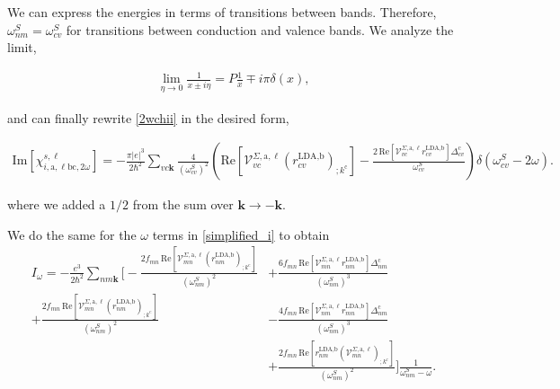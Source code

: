 We can express the energies in terms of transitions between bands. Therefore, $\omega^{S}_{nm} = \omega^{S}_{cv}$ for transitions between conduction and valence bands. We analyze the limit,

\begin{eqnarray}\label{limit_eta}
\lim_{\eta\to 0}\frac{1}{x\pm i\eta}=P\frac{1}{x}\mp i\pi\delta(x),
\end{eqnarray}

and can finally rewrite \eqref{2wchii} in the desired form,

\begin{eqnarray}\label{imchi2w}
\mathrm{Im}[\chi_{i,\text{a},\ell\text{b}\text{c},2\omega}^{s,\ell}] = -\frac{\pi \vert e\vert^{3}}{2\hbar^2}\sum_{vc\mathbf{k}}\frac{4}{(\omega^{S}_{cv})^{2}}\left(\mathrm{Re}\left[\mathcal{V}^{\Sigma,\text{a},\ell}_{vc}\left(r^{\text{LDA,b}}_{cv}\right)_{;k^{\text{c}}}\right] - \frac{2\,\mathrm{Re}\left[\mathcal{V}^{\Sigma,\text{a},\ell}_{vc}r^{\text{LDA,b}}_{cv}\right]\Delta^{\text{c}}_{cv}}{\omega^{S}_{cv}}\right)\delta(\omega^{S}_{cv}-2\omega).
\end{eqnarray}

where we added a $1/2$ from the sum over $\mathbf{k} \rightarrow - \mathbf{k}$.

We do the same for the $\omega$ terms in \eqref{simplified_i} 
to obtain
\begin{align}\label{wchii}
I_{\omega}
= -\frac{e^3}{2\hbar^2}\sum_{nm\mathbf{k}}
\Biggl[
 - \frac{2f_{mn}\,\mathrm{Re}\left[\mathcal{V}^{\Sigma,\text{a},\ell}_{mn}\left(r^{\text{LDA,b}}_{nm}\right)_{;k^{\text{c}}}\right]}{(\omega^{S}_{nm})^{2}}
&+ \frac{6f_{mn}\,\mathrm{Re}\left[\mathcal{V}^{\Sigma,\text{a},\ell}_{mn}r^{\text{LDA,b}}_{nm}\right]\Delta^{\text{c}}_{nm}}{(\omega^{S}_{nm})^{3}}\nonumber\\
 + \frac{2f_{mn}\,\mathrm{Re}\left[\mathcal{V}^{\Sigma,\text{a},\ell}_{mn}\left(r^{\text{LDA,b}}_{nm}\right)_{;k^{\text{c}}}\right]}{(\omega^{S}_{nm})^{2}}
&- \frac{4f_{mn}\,\mathrm{Re}\left[\mathcal{V}^{\Sigma,\text{a},\ell}_{nm}r^{\text{LDA,b}}_{mn}\right]\Delta_{nm}^{\text{c}}}{(\omega^{S}_{nm})^{3}}\nonumber\\
&+ \frac{2f_{mn}\,\mathrm{Re}\left[r^{\text{LDA,b}}_{nm}\left(\mathcal{V}^{\Sigma,\text{a},\ell}_{mn}\right)_{;k^{\text{c}}}\right]}{(\omega^{S}_{nm})^{2}}
\Biggr]\frac{1}{\omega^{S}_{nm}-\omega}.
\end{align}

